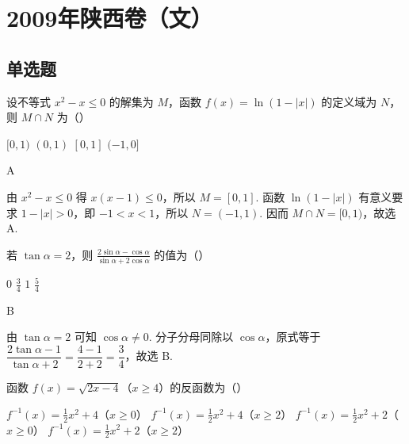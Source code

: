 \chapter{2009年陕西卷（文）}

\section{单选题}

\begin{problem}
设不等式 \(x^{2} - x \leqslant 0\) 的解集为 \(M\)，函数 \(f(x) = \ln (1 - |x|)\) 的定义域为 \(N\)，则 \(M \cap N\) 为（\quad）

\choices
    {\([0,1)\)}
    {\((0,1)\)}
    {\([0,1]\)}
    {\((-1,0]\)}
\end{problem}

\begin{answer}
A
\end{answer}

\begin{solution}
由 \(x^{2}-x\leqslant 0\) 得 \(x(x-1)\leqslant 0\)，所以 \(M=[0,1]\). 函数 \(\ln(1-|x|)\) 有意义要求 \(1-|x|>0\)，即 \(-1<x<1\)，所以 \(N=(-1,1)\). 因而 \(M\cap N=[0,1)\)，故选 A.
\end{solution}

\begin{problem}
若 \(\tan \alpha = 2\)，则 \(\frac{2\sin\alpha - \cos\alpha}{\sin\alpha + 2\cos\alpha}\) 的值为（\quad）

\choices
    {\(0\)}
    {\( \frac{3}{4} \)}
    {\(1\)}
    {\(\frac{5}{4}\)}
\end{problem}

\begin{answer}
B
\end{answer}

\begin{solution}
由 \(\tan\alpha=2\) 可知 \(\cos\alpha\neq 0\). 分子分母同除以 \(\cos\alpha\)，原式等于 \(\dfrac{2\tan\alpha-1}{\tan\alpha+2}=\dfrac{4-1}{2+2}=\dfrac{3}{4}\)，故选 B.
\end{solution}

\begin{problem}
函数 \( f(x) = \sqrt{2x - 4} \)（\(x \geqslant 4\)）的反函数为（\quad）

\choices
    {\(f^{-1}(x) = \frac{1}{2} x^{2} + 4\)（\(x \geqslant 0\)）}
    {\(f^{-1}(x) = \frac{1}{2} x^2 + 4\)（\(x \geqslant 2\)）}
    {\(f^{-1}(x) = \frac{1}{2} x^2 + 2\)（\(x \geqslant 0\)）}
    {\(f^{-1}(x) = \frac{1}{2} x^2 + 2\)（\(x \geqslant 2\)）}
\end{problem}

